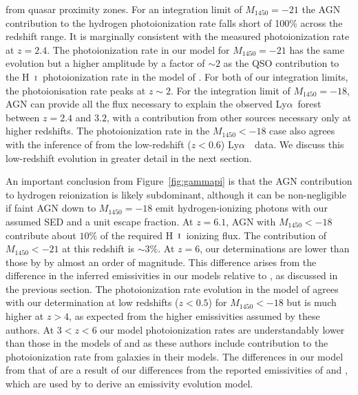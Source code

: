 \documentclass[fleqn,usenatbib]{mnras}
\def\lya{Ly$\alpha$~}
\def\HI{\hbox{H~$\scriptstyle\rm I$}}
\begin{document}
\citet{2011MNRAS.412.2543C} from quasar proximity zones.  For an
integration limit of $M_{1450}=-21$ the AGN contribution to the
hydrogen photoionization rate falls short of 100\% across the redshift
range.  It is marginally consistent with the measured photoionization
rate at $z=2.4$.  The photoionization rate in our model for
$M_{1450}=-21$ has the same evolution but a higher amplitude by a
factor of $\sim 2$ as the QSO contribution to the \HI\ photoionization
rate in the model of \citet{2012ApJ...746..125H}.  For both of our
integration limits, the photoionisation rate peaks at $z\sim 2$.  For
the integration limit of $M_{1450}=-18$, AGN can provide all the flux
necessary to explain the observed \lya forest between $z=2.4$ and
$3.2$, with a contribution from other sources necessary only at higher
redshifts.  The photoionization rate in the $M_{1450}<-18$ case also
agrees with the inference of \citet{2017MNRAS.467.3172G} from the
low-redshift ($z<0.6$) \lya\ data.  We discuss this low-redshift
evolution in greater detail in the next section.

An important conclusion from Figure~\ref{fig:gammapi} is that the AGN
contribution to hydrogen reionization is likely subdominant, although
it can be non-negligible if faint AGN down to $M_{1450}=-18$ emit
hydrogen-ionizing photons with our assumed SED and a unit escape
fraction.  At $z=6.1$, AGN with $M_{1450}<-18$ contribute about $10\%$
of the required \HI\ ionizing flux.  The contribution of
$M_{1450}<-21$ at this redshift is $\sim 3\%$.  At $z=6$, our
determinations are lower than those by \citet{2015AA...578A..83G} by
almost an order of magnitude.  This difference arises from the
difference in the inferred emissivities in our models relative to
\citet{2015AA...578A..83G}, as discussed in the previous section.  The
photoionization rate evolution in the model of
\citet{2015ApJ...813L...8M} agrees with our determination at low
redshifts ($z<0.5$) for $M_{1450}<-18$ but is much higher at $z>4$, as
expected from the higher emissivities assumed by these authors.  At
$3<z<6$ our model photoionization rates are understandably lower than
those in the models of \citet{2017ApJ...837..106O} and
\citet{2018arXiv180104931P} as these authors include contribution to
the photoionization rate from galaxies in their models. The
differences in our model from that of \citet{2015MNRAS.451L..30K} are
a result of our differences from the reported emissivities of
\citet{2009MNRAS.392...19C} and \citet{2013A&A...551A..29P}, which are
used by \citet{2015MNRAS.451L..30K} to derive an emissivity evolution
model.
\end{document}
